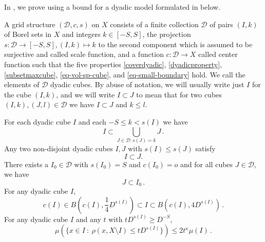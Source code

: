 In , we prove  using a
bound for a dyadic model formulated in  below.

A grid structure $(\mathcal{D}, c, s)$ on $X$ consists of a finite collection $\mathcal{D}$ of pairs $(I, k)$ of Borel
sets in $X$ and integers $k \in [-S, S]$, the projection $s\colon \mathcal{D}\to [-S, S], (I, k) \mapsto k$ to the second component which is assumed to be surjective and
called scale function, and a function $c:\mathcal{D}\to X$
called center function such that the five properties
\eqref{coverdyadic}, \eqref{dyadicproperty}, \eqref{subsetmaxcube},
\eqref{eq-vol-sp-cube}, and \eqref{eq-small-boundary} hold. We call the elements of $\mathcal{D}$ dyadic cubes. By abuse of notation, we will usually write just $I$ for the cube $(I,k)$, and we will write $I \subset J$ to mean that for two cubes $(I,k), (J, l) \in \mathcal{D}$ we have $I \subset J$ and $k \le l$.

For each dyadic cube $I$ and each $-S\le k<s(I)$ we have
\begin{equation}\label{coverdyadic}
    I\subset \bigcup_{J\in \mathcal {D}: s(J)=k}J\, .
\end{equation}
Any two non-disjoint dyadic cubes $I,J$ with $s(I)\le s(J)$ satisfy
\begin{equation}\label{dyadicproperty}
    I\subset J.
\end{equation}
There exists a $I_0 \in \mathcal{D}$ with $s(I_0) = S$ and $c(I_0) = o$
and for all cubes $J \in \mathcal{D}$, we have
\begin{equation}\label{subsetmaxcube}
    J \subset I_0\,.
\end{equation}
For any dyadic cube $I$,
\begin{equation}
    \label{eq-vol-sp-cube}
    c(I)\in B(c(I), \frac{1}{4} D^{s(I)}) \subset I \subset B(c(I), 4 D^{s(I)})\,.
\end{equation}
For any dyadic cube $I$ and any $t$ with $tD^{s(I)} \ge D^{-S}$,
\begin{equation}
    \label{eq-small-boundary}
    \mu(\{x \in I \ : \ \rho(x, X \setminus I) \leq t D^{s(I)}\}) \le 2 t^\kappa \mu(I)\,.
\end{equation}



